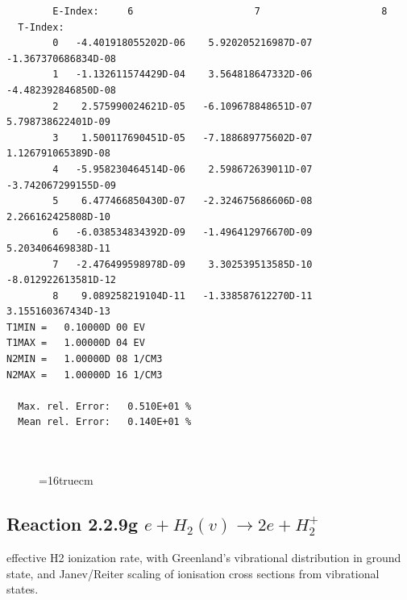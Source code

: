 \documentclass[12pt,dvipdfmx]{article}
\begin{document}
\begin{small}
\begin{verbatim}
        E-Index:     6                     7                     8
  T-Index:
        0   -4.401918055202D-06    5.920205216987D-07   -1.367370686834D-08
        1   -1.132611574429D-04    3.564818647332D-06   -4.482392846850D-08
        2    2.575990024621D-05   -6.109678848651D-07    5.798738622401D-09
        3    1.500117690451D-05   -7.188689775602D-07    1.126791065389D-08
        4   -5.958230464514D-06    2.598672639011D-07   -3.742067299155D-09
        5    6.477466850430D-07   -2.324675686606D-08    2.266162425808D-10
        6   -6.038534834392D-09   -1.496412976670D-09    5.203406469838D-11
        7   -2.476499598978D-09    3.302539513585D-10   -8.012922613581D-12
        8    9.089258219104D-11   -1.338587612270D-11    3.155160367434D-13
T1MIN =   0.10000D 00 EV
T1MAX =   1.00000D 04 EV
N2MIN =   1.00000D 08 1/CM3
N2MAX =   1.00000D 16 1/CM3

  Max. rel. Error:   0.510E+01 %
  Mean rel. Error:   0.140E+01 %



\end{verbatim}\end{small}
\begin{figure} \label{2.2.9}
\epsfxsize=16truecm
\end{figure}
\newpage

\subsection{
Reaction 2.2.9g  $  e + H_2(v)       \rightarrow 2e + H_2^+  $
}

effective H2 ionization rate, with Greenland's vibrational distribution
in ground state, and Janev/Reiter scaling \cite{kn:JnRei2003} of ionisation cross sections from vibrational states.
\end{document}
